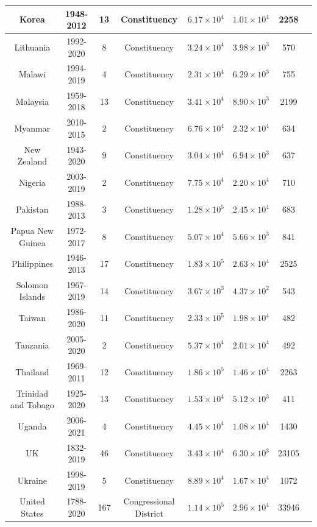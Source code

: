 \documentclass[reprint,aps,prl,showpacs,twocolumn, superscriptaddress]{revtex4-2}
\begin{document}
\begin{table}[h]
\begin{tabular}{|c|c|c|c|c|c|c|c|}
Korea & 1948-2012 & 13 & Constituency & $6.17\times 10^{4}$ & $1.01\times 10^{4}$ & 2258\\ \hline
Lithuania & 1992-2020 & 8 & Constituency & $3.24\times 10^{4}$ & $3.98\times 10^{3}$ & 570\\ \hline
Malawi & 1994-2019 & 4 & Constituency & $2.31\times 10^{4}$ & $6.29\times 10^{3}$ & 755\\ \hline
Malaysia & 1959-2018 & 13 & Constituency & $3.41\times 10^{4}$ & $8.90\times 10^{3}$ & 2199\\ \hline
Myanmar & 2010-2015 & 2 & Constituency & $6.76\times 10^{4}$ & $2.32\times 10^{4}$ & 634\\ \hline
New Zealand & 1943-2020 & 9 & Constituency & $3.04\times 10^{4}$ & $6.94\times 10^{3}$ & 637\\ \hline
Nigeria & 2003-2019 & 2 & Constituency & $7.75\times 10^{4}$ & $2.20\times 10^{4}$ & 710\\ \hline
Pakistan & 1988-2013 & 3 & Constituency & $1.28\times 10^{5}$ & $2.45\times 10^{4}$ & 683\\ \hline
Papua New Guinea & 1972-2017 & 8 & Constituency & $5.07\times 10^{4}$ & $5.66\times 10^{3}$ & 841\\ \hline
Philippines & 1946-2013 & 17 & Constituency & $1.83\times 10^{5}$ & $2.63\times 10^{4}$ & 2525\\ \hline
Solomon Islands & 1967-2019 & 14 & Constituency & $3.67\times 10^{3}$ & $4.37\times 10^{2}$ & 543\\ \hline
Taiwan & 1986-2020 & 11 & Constituency & $2.33\times 10^{5}$ & $1.98\times 10^{4}$ & 482\\ \hline
Tanzania & 2005-2020 & 2 & Constituency & $5.37\times 10^{4}$ & $2.01\times 10^{4}$ & 492\\ \hline
Thailand & 1969-2011 & 12 & Constituency & $1.86\times 10^{5}$ & $1.46\times 10^{4}$ & 2263\\ \hline
Trinidad and Tobago & 1925-2020 & 13 & Constituency & $1.53\times 10^{4}$ & $5.12\times 10^{3}$ & 411\\ \hline
Uganda & 2006-2021 & 4 & Constituency & $4.45\times 10^{4}$ & $1.08\times 10^{4}$ & 1430\\ \hline
UK & 1832-2019 & 46 & Constituency & $3.43\times 10^{4}$ & $6.30\times 10^{3}$ & 23105\\ \hline
Ukraine & 1998-2019 & 5 & Constituency & $8.89\times 10^{4}$ & $1.67\times 10^{4}$ & 1072\\ \hline
United States & 1788-2020 & 167 & Congressional District & $1.14\times 10^{5}$ & $2.96\times 10^{4}$ & 33946\\ \hline

\end{tabular}
\end{table}
\end{document}
